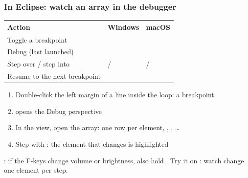 \documentclass[aspectratio=169,10pt,compress]{beamer}
\newif\ifActivities  \Activitiestrue   %
\begin{document}
\begin{frame}[t,fragile] \frametitle{In Eclipse: watch an array in the debugger}


\begin{table}
		\footnotesize
		\begin{tabular}{@{}L{0.34\textwidth}L{0.24\textwidth}L{0.30\textwidth}@{}}
			\toprule
			\textbf{Action} & \textbf{Windows} & \textbf{macOS} \\
			\midrule
			Toggle a breakpoint           &  &  \\
			Debug (last launched)         &               &  \\
			Step over / step into         &  /    &  /  \\
			Resume to the next breakpoint &                &  \\
			\bottomrule
		\end{tabular}
\end{table}%


	\begin{enumerate}\small
		\item Double-click the left margin of a line inside the loop: a breakpoint
		\item {} opens the Debug perspective
		\item In the  view, open the array: one row per element, \hCode{[0]}, \hCode{[1]}, \dots
		\item Step with : the element that changes is highlighted
	\end{enumerate}
	\footnotesize {}: if the F-keys change volume or brightness, also hold .
	Try it on : watch  change one element per step.
\end{frame}



\fi %



\ifActivities %
\end{document}
